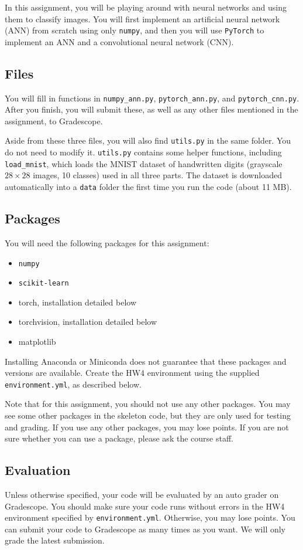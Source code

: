 \documentclass[11pt]{exam}
\begin{document}
In this assignment, you will be playing around with neural networks and using them to classify images. You will first implement an artificial neural network (ANN) from scratch using only \verb|numpy|, and then you will use \verb|PyTorch| to implement an ANN and a convolutional neural network (CNN).


\subsection*{Files}
You will fill in functions in \verb|numpy_ann.py|, \verb|pytorch_ann.py|, and \verb|pytorch_cnn.py|. After you finish, you will submit these, as well as any other files mentioned in the assignment, to Gradescope.

Aside from these three files, you will also find \verb|utils.py| in the same folder. You do not need to modify it. \verb|utils.py| contains some helper functions, including \verb|load_mnist|, which loads the MNIST dataset of handwritten digits (grayscale $28 \times 28$ images, 10 classes) used in all three parts. The dataset is downloaded automatically into a \verb|data| folder the first time you run the code (about 11 MB).

\subsection*{Packages}
You will need the following packages for this assignment:
\begin{itemize}
    \item \verb|numpy|
    \item \verb|scikit-learn|
    \item torch, installation detailed below
    \item torchvision, installation detailed below
    \item matplotlib
\end{itemize}

Installing Anaconda or Miniconda does not guarantee that these packages and versions are available. Create the HW4 environment using the supplied \verb|environment.yml|, as described below.

Note that for this assignment, you should not use any other packages. You may see some other packages in the skeleton code, but they are only used for testing and grading. If you use any other packages, you may lose points. If you are not sure whether you can use a package, please ask the course staff.

\subsection*{Evaluation}
Unless otherwise specified, your code will be evaluated by an auto grader on Gradescope. You should make sure your code runs without errors in the HW4 environment specified by \verb|environment.yml|. Otherwise, you may lose points. You can submit your code to Gradescope as many times as you want. We will only grade the latest submission.
\end{document}
